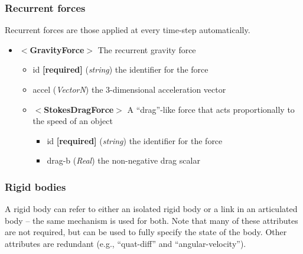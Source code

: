 \documentclass{article}
\begin{document}
\begin{landscape}
\subsubsection{Recurrent forces}
Recurrent forces are those applied at every time-step automatically.
\begin{itemize}
\item $<$\textbf{GravityForce}$>$ The recurrent gravity force
\begin{itemize}
\item id \textbf{[required]} (\emph{string}) the identifier for the force 
\item accel (\emph{VectorN}) the 3-dimensional acceleration vector
\end{itemize}
\begin{itemize}
\item $<$\textbf{StokesDragForce}$>$ A ``drag''-like force that acts proportionally to the speed of an object
\begin{itemize}
\item id \textbf{[required]} (\emph{string}) the identifier for the force 
\item drag-b (\emph{Real}) the non-negative drag scalar
\end{itemize}
\end{itemize}
\end{itemize}

\subsubsection{Rigid bodies}
\label{section:rigidbodies}
A rigid body can refer to either an isolated rigid body or a link in an articulated body -- the same mechanism is used for both. Note that many of these attributes are not required, but can be used to fully specify the state of the body.  Other attributes are redundant (e.g., ``quat-diff'' and ``angular-velocity'').


\end{landscape}
\end{document}
